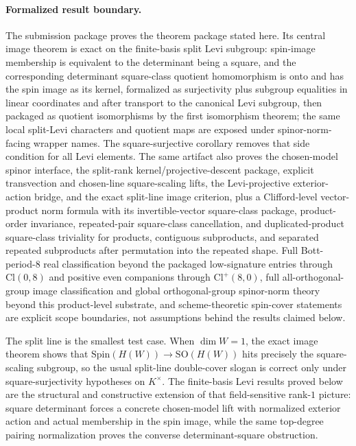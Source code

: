 \documentclass{birkjour}
\theoremstyle{plain}
\theoremstyle{definition}
\theoremstyle{remark}
\newcommand{\Cl}{\mathrm{Cl}}
\newcommand{\Spin}{\mathrm{Spin}}
\newcommand{\SO}{\mathrm{SO}}
\begin{document}
\paragraph{Formalized result boundary.}
The submission package proves the theorem package stated here. Its central
image theorem is exact on the finite-basis split Levi subgroup: spin-image
membership is equivalent to the determinant being a square, and the
corresponding determinant square-class quotient homomorphism is onto and has the spin image
as its kernel, formalized as surjectivity plus subgroup equalities in linear coordinates and
after transport to the canonical Levi subgroup, then packaged as quotient isomorphisms by the
first isomorphism theorem; the same local split-Levi characters and quotient
maps are exposed under spinor-norm-facing wrapper names. The square-surjective corollary
removes that side condition for all Levi elements.
The same artifact also proves the chosen-model spinor interface, the split-rank
kernel/projective-descent package, explicit transvection and chosen-line
square-scaling lifts, the Levi-projective exterior-action bridge, and the exact
split-line image criterion, plus a Clifford-level vector-product norm formula
with its invertible-vector square-class package, product-order invariance,
repeated-pair square-class cancellation, and duplicated-product square-class
triviality for products, contiguous subproducts, and separated repeated
subproducts after permutation into the repeated shape.
Full Bott-period-$8$ real classification beyond
the packaged low-signature entries through $\Cl(0,8)$ and positive even companions
through $\Cl^+(8,0)$, full all-orthogonal-group image
classification and global orthogonal-group spinor-norm theory beyond this
product-level substrate, and scheme-theoretic spin-cover
statements are explicit scope boundaries, not assumptions behind the results
claimed below.

The split line is the smallest test case. When $\dim W=1$, the exact image
theorem shows that $\Spin(H(W)) \to \SO(H(W))$ hits precisely the
square-scaling subgroup, so the usual split-line double-cover slogan is correct
only under square-surjectivity hypotheses on $K^\times$. The finite-basis Levi
results proved below are the structural and constructive extension of that
field-sensitive rank-$1$ picture: square determinant forces a concrete
chosen-model lift with normalized exterior action and actual membership in the
spin image, while the same top-degree pairing normalization proves the converse
determinant-square obstruction.
\end{document}
